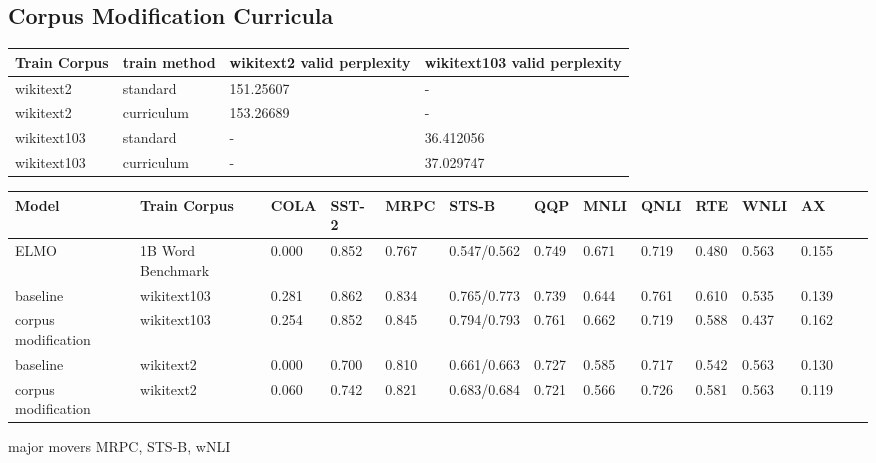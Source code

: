 \subsection{Corpus Modification Curricula}
\begin{table}[h!]
\tiny
\begin{tabular}{|l|l|l|l|} \hline
\textbf{Train Corpus} & \textbf{train method} &  \textbf{wikitext2 valid perplexity} & \textbf{wikitext103 valid perplexity} \\ \hline
wikitext2 & standard & 151.25607 & - \\ \hline
wikitext2 & curriculum & 153.26689 & - \\ \hline
wikitext103 & standard & - & 36.412056 \\ \hline
wikitext103 & curriculum & - & 37.029747 \\ \hline
\end{tabular}
\label{table:corpuscurriculaperplexity}
\end{table}
\begin{table}[h!]
\tiny
\begin{tabular}{|l|l|l|l|l|l|l|l|l|l|l|l|l|l|} \hline
\textbf{Model} & \textbf{Train Corpus} & \textbf{COLA} & \textbf{SST-2} & \textbf{MRPC} & \textbf{STS-B} & \textbf{QQP}& \textbf{MNLI} & \textbf{QNLI} & \textbf{RTE} & \textbf{WNLI} & \textbf{AX} \\ \hline
ELMO \cite{Smith2019ContextualWR} & 1B Word Benchmark & 0.000 & 0.852 &  0.767 & 0.547/0.562 & 0.749 & 0.671 & 0.719 & 0.480 & 0.563 & 0.155 \\ \hline
baseline & wikitext103 & 0.281 & 0.862 & 0.834 & 0.765/0.773 & 0.739& 0.644 & 0.761 &  0.610 & 0.535 & 0.139 \\\hline
corpus modification & wikitext103 & 0.254 & 0.852 & 0.845 & 0.794/0.793 & 0.761 & 0.662 & 0.719 & 0.588 & 0.437 & 0.162 \\ \hline
baseline & wikitext2 & 0.000 & 0.700 & 0.810 & 0.661/0.663 & 0.727 & 0.585 & 0.717 & 0.542 & 0.563 & 0.130 \\ \hline
corpus modification & wikitext2 & 0.060 & 0.742 & 0.821 & 0.683/0.684 & 0.721 & 0.566 & 0.726 & 0.581 & 0.563 & 0.119 \\ \hline
\end{tabular}
\label{table:corpuscurriculaGLUE}
\end{table}
major movers MRPC, STS-B, wNLI
